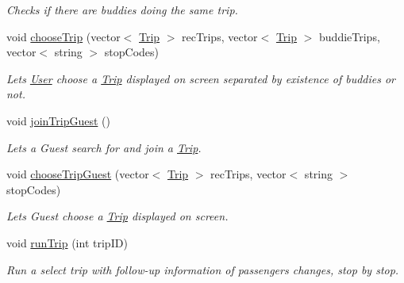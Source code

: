 \begin{Indent}
\begin{DoxyCompactItemize}
\begin{DoxyCompactList}\small\item\em Checks if there are buddies doing the same trip. \end{DoxyCompactList}\item 
void \hyperlink{group___agency_gab93c48db5700b6d02bf81b3cd3af6711}{choose\+Trip} (vector$<$ \hyperlink{class_trip}{Trip} $>$ rec\+Trips, vector$<$ \hyperlink{class_trip}{Trip} $>$ buddie\+Trips, vector$<$ string $>$ stop\+Codes)
\begin{DoxyCompactList}\small\item\em Lets \hyperlink{class_user}{User} choose a \hyperlink{class_trip}{Trip} displayed on screen separated by existence of buddies or not. \end{DoxyCompactList}\item 
void \hyperlink{group___agency_ga5a21d06cf7fd4cae84b69554555f229e}{join\+Trip\+Guest} ()
\begin{DoxyCompactList}\small\item\em Lets a Guest search for and join a \hyperlink{class_trip}{Trip}. \end{DoxyCompactList}\item 
void \hyperlink{group___agency_ga7e9a9bafaab57a8e9a5963302b7401ff}{choose\+Trip\+Guest} (vector$<$ \hyperlink{class_trip}{Trip} $>$ rec\+Trips, vector$<$ string $>$ stop\+Codes)
\begin{DoxyCompactList}\small\item\em Lets Guest choose a \hyperlink{class_trip}{Trip} displayed on screen. \end{DoxyCompactList}\item 
void \hyperlink{group___agency_ga76d5990291e33a194a46c390986a668b}{run\+Trip} (int trip\+ID)
\begin{DoxyCompactList}\small\item\em Run a select trip with follow-\/up information of passengers changes, stop by stop. \end{DoxyCompactList}\end{DoxyCompactItemize}
\end{Indent}
